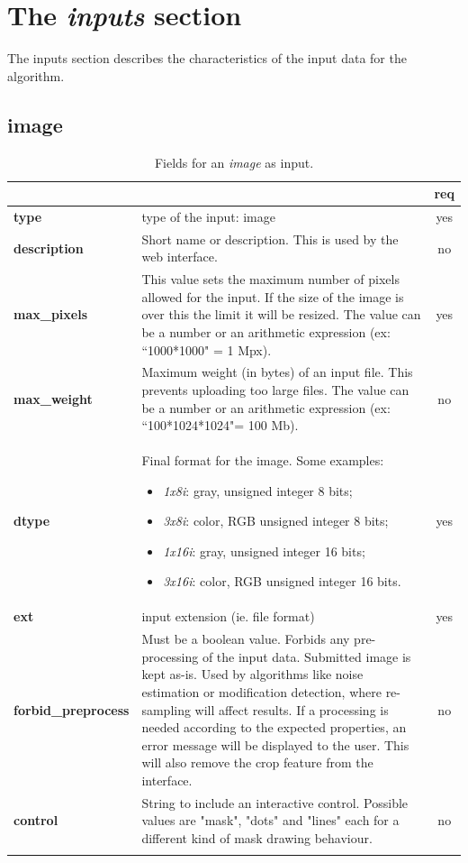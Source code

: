 \section{The \emph{inputs} section}
The inputs section describes the characteristics of the input data for the algorithm.

\subsection{image}

\begin{longtable}{|>{\bf}L{\linewidth}|L{\linewidth}|c|}
\hline
{}     &  & {\bf req} \tabularnewline 
\hline \hline
 type         & type of the input: image & yes \\ \hline
 description  & Short name or description. This is used by the web interface. & no \\ \hline
 max\_pixels  & This value sets the maximum number of pixels allowed for the input. If the size of the image is over this the limit it will be resized. The value can be a number or an arithmetic expression (ex:  ``1000*1000" = 1 Mpx).  & yes \\ \hline
 max\_weight   & Maximum weight (in bytes) of an input file. This prevents uploading too large files. The value can be a number or an arithmetic expression (ex: ``100*1024*1024"= 100 Mb). & no \\ \hline
 dtype        & Final format for the image. Some examples:
\begin{itemize}
  \setlength\itemsep{-0.5em}
  \item \textit{1x8i}: gray, unsigned integer 8 bits;
  \item \textit{3x8i}: color, RGB unsigned integer 8 bits;
  \item \textit{1x16i}: gray, unsigned integer 16 bits;
  \item \textit{3x16i}: color, RGB unsigned integer 16 bits.
\end{itemize} 
 & yes \\ \hline
 ext          & input extension (ie. file format) & yes \\ \hline
forbid\_preprocess & Must be a boolean value. Forbids any pre-processing of the input data.
Submitted image is kept as-is. Used by algorithms like noise estimation or modification detection, where re-sampling will affect results. 
If a processing is needed according to the expected properties, an error message will be displayed to the user. This will also remove the crop feature from the interface.
& no \\ \hline
 control & String to include an interactive control. Possible values are "mask", "dots" and "lines" each for a different kind of mask drawing behaviour. & no \\ \hline
\caption{Fields for an \emph{image} as input.}
\end{longtable}

